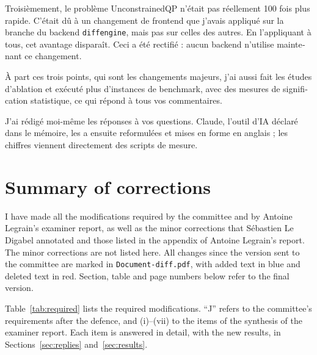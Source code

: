 \documentclass[letterpaper,12pt]{article}
\begin{document}
\begin{otherlanguage}{french}
Troisièmement, le problème UnconstrainedQP n'était pas réellement 100 fois plus rapide. C'était
dû à un changement de frontend que j'avais appliqué sur la branche du backend
\texttt{diffengine}, mais pas sur celles des autres. En l'appliquant à tous, cet avantage
disparaît. Ceci a été rectifié : aucun backend n'utilise maintenant ce changement.

À part ces trois points, qui sont les changements majeurs, j'ai aussi fait les études
d'ablation et exécuté plus d'instances de benchmark, avec des mesures de signification
statistique, ce qui répond à tous vos commentaires.

J'ai rédigé moi-même les réponses à vos questions. Claude, l'outil d'IA déclaré dans le
mémoire, les a ensuite reformulées et mises en forme en anglais ; les chiffres viennent
directement des scripts de mesure.
\end{otherlanguage}

\section{Summary of corrections}

I have made all the modifications required by the committee and by Antoine Legrain's
examiner report, as well as the minor corrections that Sébastien Le Digabel annotated and those
listed in the appendix of Antoine Legrain's report. The minor corrections are not listed here.
All changes since the version sent to the committee are marked in \texttt{Document-diff.pdf},
with added text in blue and deleted text in red. Section, table and page numbers below refer to
the final version.

Table~\ref{tab:required} lists the required modifications. ``J'' refers to the committee's
requirements after the defence, and (i)--(vii) to the items of the synthesis of the examiner
report. Each item is answered in detail, with the new results, in
Sections~\ref{sec:replies} and~\ref{sec:results}.
\end{document}
